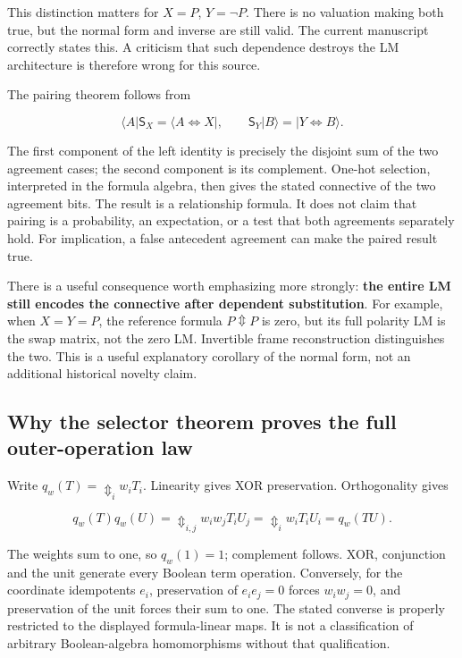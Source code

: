 \documentclass[
  10pt,
]{article}
\begin{document}
This distinction matters for \(X=P\), \(Y=\neg P\). There is no
valuation making both true, but the normal form and inverse are still
valid. The current manuscript correctly states this. A criticism that
such dependence destroys the LM architecture is therefore wrong for this
source.

The pairing theorem follows from

\[
\langle A|\mathsf S_X=\langle A\Leftrightarrow X|,
\qquad
\mathsf S_Y|B\rangle=|Y\Leftrightarrow B\rangle.
\]

The first component of the left identity is precisely the disjoint sum
of the two agreement cases; the second component is its complement.
One-hot selection, interpreted in the formula algebra, then gives the
stated connective of the two agreement bits. The result is a
relationship formula. It does not claim that pairing is a probability,
an expectation, or a test that both agreements separately hold. For
implication, a false antecedent agreement can make the paired result
true.

There is a useful consequence worth emphasizing more strongly:
\textbf{the entire LM still encodes the connective after dependent
substitution}. For example, when \(X=Y=P\), the reference formula
\(P\Updownarrow P\) is zero, but its full polarity LM is the swap
matrix, not the zero LM. Invertible frame reconstruction distinguishes
the two. This is a useful explanatory corollary of the normal form, not
an additional historical novelty claim.

\subsection{Why the selector theorem proves the full outer-operation
law}\label{why-the-selector-theorem-proves-the-full-outer-operation-law}

Write \(q_w(T)=\mathop{\Updownarrow}_i w_iT_i\). Linearity gives XOR
preservation. Orthogonality gives

\[
q_w(T)q_w(U)
=\mathop{\Updownarrow}_{i,j}w_iw_jT_iU_j
=\mathop{\Updownarrow}_{i}w_iT_iU_i
=q_w(TU).
\]

The weights sum to one, so \(q_w(1)=1\); complement follows. XOR,
conjunction and the unit generate every Boolean term operation.
Conversely, for the coordinate idempotents \(e_i\), preservation of
\(e_ie_j=0\) forces \(w_iw_j=0\), and preservation of the unit forces
their sum to one. The stated converse is properly restricted to the
displayed formula-linear maps. It is not a classification of arbitrary
Boolean-algebra homomorphisms without that qualification.
\end{document}
